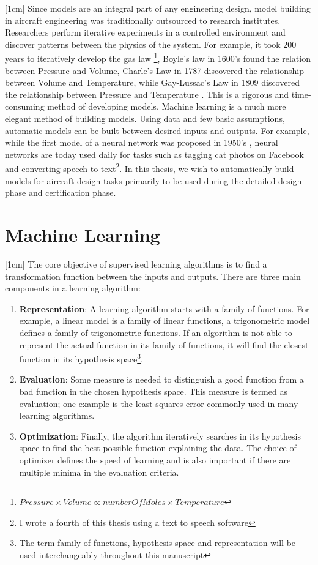 [1cm]
Since models are an integral part of any engineering design, model building in aircraft engineering was traditionally outsourced to research institutes. Researchers perform iterative experiments in a controlled environment and discover patterns between the physics of the system. For example, it took 200 years to iteratively develop the gas law \footnote{$Pressure \times Volume \propto numberOfMoles \times Temperature$}, Boyle's law in 1600's found the relation between Pressure and Volume, Charle's Law in 1787 discovered the relationship between Volume and Temperature, while Gay-Lussac's Law in 1809 discovered the relationship between Pressure and Temperature \cite{clapeyron1834memoire}. This is a rigorous and time-consuming method of developing models. Machine learning is a much more elegant method of building models. Using data and few basic assumptions, automatic models can be built between desired inputs and outputs. For example, while the first model of a neural network was proposed in 1950's \cite{mcculloch1943logical, rosenblatt1958perceptron}, neural networks are today used daily for tasks such as tagging cat photos on Facebook and converting speech to text\footnote{I wrote a fourth of this thesis using a text to speech software}. In this thesis, we wish to automatically build models for aircraft design tasks primarily to be used during the detailed design phase and certification phase. 


\section{Machine Learning}\label{secMachineLearning}
[1cm]
The core objective of supervised learning algorithms is to find a transformation function between the inputs and outputs. There are three main components in a learning algorithm:
\begin{enumerate}
\item \textbf{Representation}: A learning algorithm starts with a family of functions. For example, a linear model is a family of linear functions, a trigonometric model defines a family of trigonometric functions. If an algorithm is not able to represent the actual function in its family of functions, it will find the closest function in its hypothesis space\footnote{The term family of functions, hypothesis space and representation will be used interchangeably throughout this manuscript}.
\item \textbf{Evaluation}: Some measure is needed to distinguish a good function from a bad function in the chosen hypothesis space. This measure is termed as evaluation; one example is the least squares error commonly used in many learning algorithms. 
\item \textbf{Optimization}: Finally, the algorithm iteratively searches in its hypothesis space to find the best possible function explaining the data. The choice of optimizer defines the speed of learning and is also important if there are multiple minima in the evaluation criteria.
\end{enumerate}

